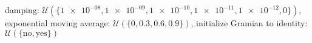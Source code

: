 damping: $\mathcal{U}(\{\num[scientific-notation=true]{1e-08},\num[scientific-notation=true]{1e-09},\num[scientific-notation=true]{1e-10},\num[scientific-notation=true]{1e-11},\num[scientific-notation=true]{1e-12},\num[scientific-notation=false]{0}\})$, exponential moving average: $\mathcal{U}(\{\num[scientific-notation=false]{0},\num[scientific-notation=true]{0.3},\num[scientific-notation=true]{0.6},\num[scientific-notation=true]{0.9}\})$, initialize Gramian to identity: $\mathcal{U}(\{\text{no},\text{yes}\})$